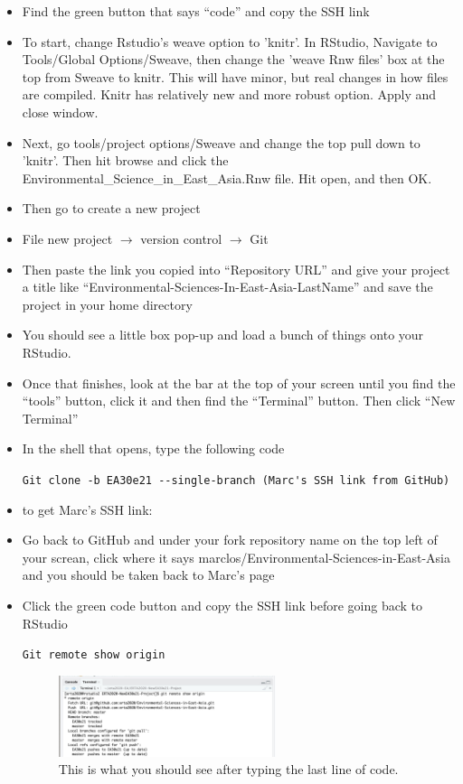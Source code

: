 \documentclass[12pt]{../SOP4_alpha}\usepackage[]{graphicx}\usepackage[]{color}
\begin{document}
\begin{itemize}
  \item Find the green button that says ``code'' and copy the SSH link
  \item To start, change Rstudio's weave option to 'knitr'. In RStudio, Navigate to Tools/Global Options/Sweave, then change the 'weave Rnw files' box at the top from Sweave to knitr. This will have minor, but real changes in how files are compiled. Knitr has relatively new and more robust option. Apply and close window. 
  \item Next, go tools/project options/Sweave and change the top pull down to 'knitr'. Then hit browse and click the Environmental\_Science\_in\_East\_Asia.Rnw file. Hit open, and then OK.
  \item Then go to create a new project
  \item File new project $\rightarrow $ version control $\rightarrow $ Git
  \item Then paste the link you copied into ``Repository URL'' and give your project a title like ``Environmental-Sciences-In-East-Asia-LastName'' and save the project in your home directory
    \item You should see a little box pop-up and load a bunch of things onto your RStudio. 
  \item Once that finishes, look at the bar at the top of your screen until you find the ``tools'' button, click it and then find the ``Terminal'' button. Then click ``New Terminal''
  \item In the shell that opens, type the following code

    \indent\verb"Git clone -b EA30e21 --single-branch (Marc's SSH link from GitHub)"
    
      \item to get Marc's SSH link:
        \item Go back to GitHub and under your fork repository name on the top left of your screan, click where it says marclos/Environmental-Sciences-in-East-Asia and you should be taken back to Marc’s page
        \item Click the green code button and copy the SSH link before going back to RStudio
        
    \indent\verb"Git remote show origin"
  
\begin{figure}
\centering
\includegraphics[width=0.6\textwidth]{graphics/terminal_output}
\caption{This is what you should see after typing the last line of code.}
\end{figure}


\end{itemize}
\end{document}
